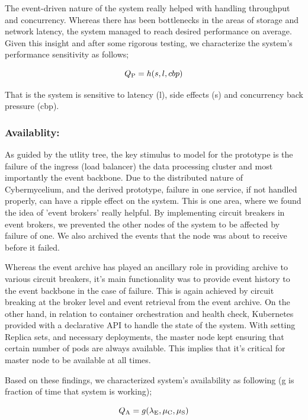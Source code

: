 \documentclass[review]{elsarticle}
\begin{document}
The event-driven nature of the system really helped with handling throughput and concurrency. Whereas there has been bottlenecks in the areas of storage and network latency, the system managed to reach desired performance on average. Given this insight and after some rigorous testing, we characterize the system's performance sensitivity as follows; 

\begin{equation}
    Q\textsubscript{P} = h(s, l, cbp)
\end{equation}

That is the system is sensitive to latency (l), side effects (s) and concurrency back pressure (cbp).

\subsubsection{Availablity:}

As guided by the utlity tree, the key stimulus to model for the prototype is the failure of the ingress (load balancer)  the data processing cluster and most importantly the event backbone. Due to the distributed nature of Cybermycelium, and the derived prototype, failure in one service, if not handled properly, can have a ripple effect on the system. This is one area, where we found the idea of 'event brokers' really helpful. By implementing circuit breakers in event brokers, we prevented the other nodes of the system to be affected by failure of one. We also archived the events that the node was about to receive before it failed. 

Whereas the event archive has played an ancillary role in providing archive to various circuit breakers, it's main functionality was to provide event history to the event backbone in the case of failure. This is again achieved by circuit breaking at the broker level and event retrieval from the event archive. On the other hand, in relation to container orchestration and health check, Kubernetes provided with a declarative API to handle the state of the system. With setting Replica sets, and necessary deployments, the master node kept ensuring that certain number of pods are always available. This implies that it's critical for master node to be available at all times.

Based on these findings, we characterized system's availability as following (g is fraction of time that system is working);

\begin{equation}
    Q\textsubscript{A} = g(\lambda\textsubscript{E} , \mu\textsubscript{C}, \mu\textsubscript{S})
\end{equation}
\end{document}
